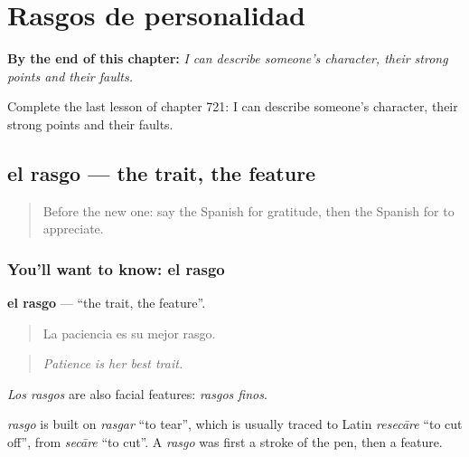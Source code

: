 
\chapter{Rasgos de personalidad}
\label{ch:es-rasgos-de-personalidad}

\begin{chapteropening}
\textbf{By the end of this chapter:} \emph{I can describe someone's character, their strong points and their faults.}

Complete the last lesson of chapter 721: I can describe someone's character, their strong points and their faults.
\end{chapteropening}

\section[el rasgo]{el rasgo — the trait, the feature}

\label{lesson:ES-C721-rasgo}



\begin{quote}
Before the new one: say the Spanish for gratitude, then the Spanish for to appreciate.
\end{quote}

\subsection*{You'll want to know: el rasgo}
\textbf{el rasgo} — \textquotedblleft{}the trait, the feature\textquotedblright{}.

\begin{quote}
La paciencia es su mejor rasgo.
\end{quote}

\begin{quote}
\emph{Patience is her best trait.}
\end{quote}

\emph{Los rasgos} are also facial features: \emph{rasgos finos}.

\begin{cousinweb}
\emph{rasgo} is built on \emph{rasgar} \textquotedblleft{}to tear\textquotedblright{}, which is usually traced to Latin \emph{resecāre} \textquotedblleft{}to cut off\textquotedblright{}, from \emph{secāre} \textquotedblleft{}to cut\textquotedblright{}. A \emph{rasgo} was first a stroke of the pen, then a feature.
\end{cousinweb}

